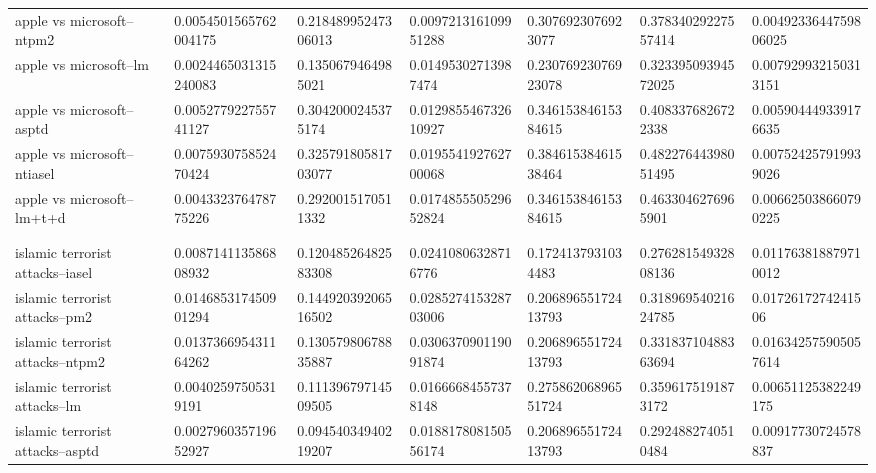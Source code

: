\begin{table}[h]
\begin{tabular}{lllllll}
apple vs microsoft--ntpm2             & 0.0054501565762004175 & 0.21848995247306013 & 0.009721316109951288 & 0.3076923076923077  & 0.37834029227557414 & 0.0049233644759806025 \\
apple vs microsoft--lm                & 0.0024465031315240083 & 0.1350679464985021  & 0.01495302713987474  & 0.23076923076923078 & 0.32339509394572025 & 0.007929932150313151  \\
apple vs microsoft--asptd             & 0.005277922755741127  & 0.3042000245375174  & 0.012985546732610927 & 0.34615384615384615 & 0.4083376826722338  & 0.005904449339176635  \\
apple vs microsoft--ntiasel           & 0.007593075852470424  & 0.32579180581703077 & 0.019554192762700068 & 0.38461538461538464 & 0.48227644398051495 & 0.007524257919939026  \\
apple vs microsoft--lm+t+d            & 0.004332376478775226  & 0.2920015170511332  & 0.017485550529652824 & 0.34615384615384615 & 0.4633046276965901  & 0.006625038660790225  \\
                                      &                       &                     &                      &                     &                     &                       \\
                                      &                       &                     &                      &                     &                     &                       \\
islamic terrorist attacks--iasel      & 0.008714113586808932  & 0.12048526482583308 & 0.02410806328716776  & 0.1724137931034483  & 0.27628154932808136 & 0.011763818879710012  \\
islamic terrorist attacks--pm2        & 0.014685317450901294  & 0.14492039206516502 & 0.028527415328703006 & 0.20689655172413793 & 0.31896954021624785 & 0.0172617274241506    \\
islamic terrorist attacks--ntpm2      & 0.013736695431164262  & 0.13057980678835887 & 0.030637090119091874 & 0.20689655172413793 & 0.33183710488363694 & 0.016342575905057614  \\
islamic terrorist attacks--lm         & 0.00402597505319191   & 0.11139679714509505 & 0.01666684557378148  & 0.27586206896551724 & 0.3596175191873172  & 0.00651125382249175   \\
islamic terrorist attacks--asptd      & 0.002796035719652927  & 0.09454034940219207 & 0.018817808150556174 & 0.20689655172413793 & 0.2924882740510484  & 0.00917730724578837   \\

\end{tabular}
\end{table}
